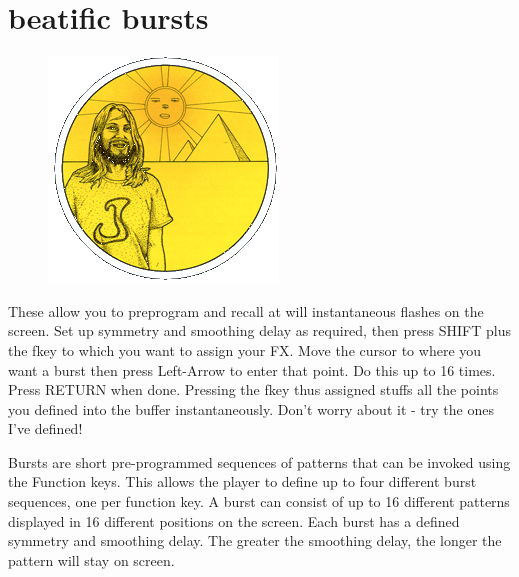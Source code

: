 \chapter{beatific bursts} 
\label{sec:bursts}
\rhead[]{\leftmark}
\lstset{style=6502Style}
\lstset{ 
   aboveskip=5pt,
   belowskip=0pt,
}

\begin{definition}
\setlength{\intextsep}{0pt}%
\setlength{\columnsep}{3pt}%
\begin{figure}
\includegraphics[width=\linewidth]{src/callout/psych.png} 
\end{figure}
\small
These allow you to preprogram and recall at will
instantaneous flashes on the screen. Set up symmetry and
smoothing delay as required, then press SHIFT plus the fkey to
which you want to assign your FX. Move the cursor to where you
want a burst then press Left-Arrow to enter that point. Do this up to
16 times. Press RETURN when done. Pressing the fkey thus
assigned stuffs all the points you defined into the buffer
instantaneously. Don’t worry about it - try the ones I've defined!
\end{definition}

Bursts are short pre-programmed sequences of patterns that can be invoked using the Function keys.
This allows the player to define up to four different burst sequences, one per function key. A burst
can consist of up to 16 different patterns displayed in 16 different positions on the screen. Each burst
has a defined symmetry and smoothing delay. The greater the smoothing delay, the longer the pattern
will stay on screen.

